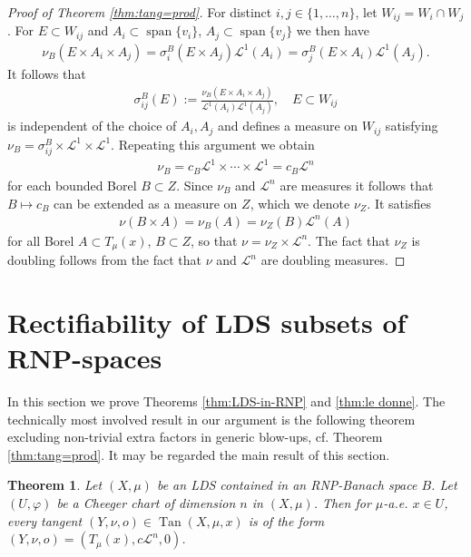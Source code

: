 \documentclass{amsart}
\newtheorem{theorem}{Theorem}[section]
\numberwithin{equation}{section}
\newcommand{\leb}{\mathcal{L}}
\newcommand{\Tan}{\operatorname{Tan}}
\begin{document}
\begin{proof}[Proof of Theorem \ref{thm:tang=prod}]
For distinct $i,j\in \{1,\ldots,n\}$, let $W_{ij}=W_i\cap W_j$. For $E\subset W_{ij}$ and $A_i\subset \operatorname{span}\{v_i\}$, $A_j\subset \operatorname{span}\{v_j\}$ we then have 
\begin{align*}
\nu_B(E\times A_i\times A_j)=\sigma_i^B(E\times A_j)\leb^1(A_i)=\sigma_j^B(E\times A_i)\leb^1(A_j).
\end{align*}
It follows that 
\begin{align*}
    \sigma_{ij}^B(E):=\frac{\nu_B(E\times A_i\times A_j)}{\leb^1(A_i)\leb^1(A_j)}, \quad E\subset W_{ij}
\end{align*}
is independent of the choice of $A_i,A_j$ and defines a measure on $W_{ij}$ satisfying $\nu_B=\sigma_{ij}^B\times \leb^1\times \leb^1$. Repeating this argument we obtain
\begin{align*}
    \nu_B=c_B\leb^1\times\cdots\times\leb^1=c_B\leb^n
\end{align*}
for each bounded Borel $B\subset Z$. Since $\nu_B$ and $\leb^n$ are measures it follows that $B\mapsto c_B$ can be extended as a measure on $Z$, which we denote $\nu_Z$. It satisfies 
\begin{align*}
    \nu(B\times A)=\nu_B(A)=\nu_Z(B)\leb^n(A)
\end{align*}
for all Borel $A\subset T_\mu(x)$, $B\subset Z$, so that $\nu=\nu_Z\times \leb^n$. The fact that $\nu_Z$ is doubling follows from the fact that $\nu$ and $\leb^n$ are doubling measures.
\end{proof}


\section{Rectifiability of LDS subsets of RNP-spaces}\label{sec:extra-factors}

In this section we prove Theorems \ref{thm:LDS-in-RNP} and \ref{thm:le donne}. The technically most involved result in our argument is the following theorem excluding non-trivial extra factors in generic blow-ups, cf. Theorem \ref{thm:tang=prod}. It may be regarded the main result of this section. 

\begin{theorem}\label{thm:no-extra-factors} Let $(X,\mu)$ be an LDS contained in an RNP-Banach space $B$. 
	Let $(U,\varphi)$ be a Cheeger chart of dimension $n$ in $(X,\mu)$. Then for $\mu$-a.e. $x\in U$, every tangent $(Y,\nu,o)\in \Tan(X,\mu,x)$ is of the form $(Y,\nu,o)=(T_\mu(x),c\leb^n,0)$.
\end{theorem}
\end{document}
